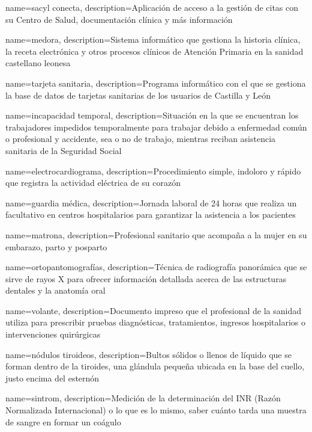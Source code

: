 \makenoidxglossaries

{
    name={sacyl conecta},
    description={Aplicación de acceso a la gestión de citas con su Centro de Salud, documentación clínica y más información}
}

{
    name={medora},
    description={Sistema informático que gestiona la historia clínica, la receta electrónica y otros procesos clínicos de Atención Primaria en la sanidad castellano leonesa}
}

{
    name={tarjeta sanitaria},
    description={Programa informático con el que se gestiona la base de datos de tarjetas sanitarias de los usuarios de Castilla y León}
}

{
    name={incapacidad temporal},
    description={Situación en la que se encuentran los trabajadores impedidos temporalmente para trabajar debido a enfermedad común o profesional y accidente, sea o no de trabajo, mientras reciban asistencia sanitaria de la Seguridad Social}
}

{
    name={electrocardiograma},
    description={Procedimiento simple, indoloro y rápido que registra la actividad eléctrica de su corazón}
}

{
    name={guardia médica},
    description={Jornada laboral de 24 horas que realiza un facultativo en centros hospitalarios para garantizar la asistencia a los pacientes}
}

{
    name={matrona},
    description={Profesional sanitario que acompaña a la mujer en su embarazo, parto y posparto}
}

{
    name={ortopantomografías},
    description={Técnica de radiografía panorámica que se sirve de rayos X para ofrecer información detallada acerca de
    las estructuras dentales y la anatomía oral}
}

{
    name={volante},
    description={Documento impreso que el profesional de la sanidad utiliza para prescribir pruebas diagnósticas, tratamientos, ingresos hospitalarios o intervenciones quirúrgicas}
}

{
    name={nódulos tiroideos},
    description={Bultos sólidos o llenos de líquido que se forman dentro de la tiroides, una glándula pequeña ubicada en la base del cuello, justo encima del esternón}
}

{
    name={sintrom},
    description={Medición de la determinación del INR (Razón Normalizada Internacional) o lo que es lo mismo, saber
    cuánto tarda una muestra de sangre en formar un coágulo}
}